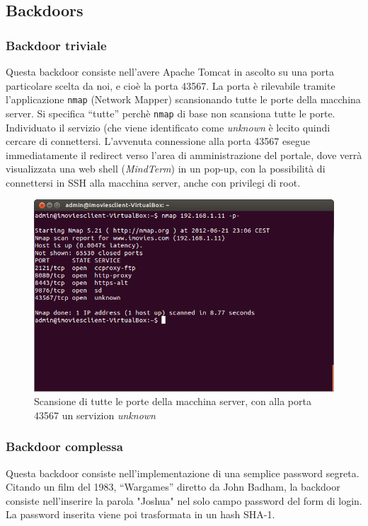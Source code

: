 \documentclass{article}
\begin{document}
\subsection{Backdoors}

\subsubsection{Backdoor triviale}
Questa backdoor consiste nell'avere Apache Tomcat in ascolto su una porta particolare scelta da noi, e cioè la porta 43567.
La porta è rilevabile tramite l'applicazione {\tt nmap} (Network Mapper) scansionando tutte le porte della macchina server. Si specifica ``tutte'' perchè {\tt nmap} di base non scansiona tutte le porte. Individuato il servizio (che viene identificato come \emph{unknown} è lecito quindi cercare di connettersi. L'avvenuta connessione alla porta 43567 esegue immediatamente il redirect verso l'area di amministrazione del portale, dove verrà visualizzata una web shell (\emph{MindTerm}) in un pop-up, con la possibilità di connettersi in SSH alla macchina server, anche con privilegi di root.
\begin{figure}[h!]
\centering
\centerline{\includegraphics[scale=0.4,keepaspectratio]{img/nmap_scan.png}}
\caption{Scansione di tutte le porte della macchina server, con alla porta 43567 un servizion \emph{unknown}}
\end{figure}

\subsubsection{Backdoor complessa}
Questa backdoor consiste nell'implementazione di una semplice password segreta. Citando un film del 1983, ``Wargames'' diretto da John Badham, la backdoor consiste nell'inserire la parola "Joshua" nel solo campo password del form di login. La password inserita viene poi trasformata in un hash SHA-1.
\end{document}
